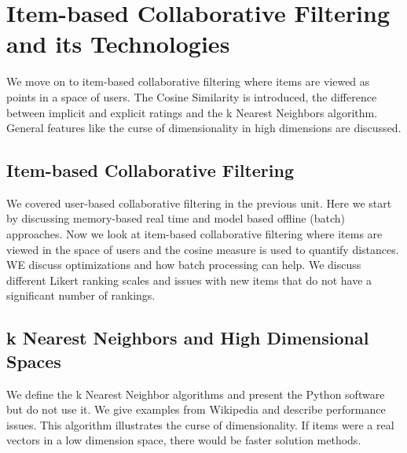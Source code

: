 \section{Item-based Collaborative Filtering and its
Technologies}\label{item-based-collaborative-filtering-and-its-technologies}

We move on to item-based collaborative filtering where items are viewed
as points in a space of users. The Cosine Similarity is introduced, the
difference between implicit and explicit ratings and the k Nearest
Neighbors algorithm. General features like the curse of dimensionality
in high dimensions are discussed.



\subsection{Item-based Collaborative
Filtering}\label{item-based-collaborative-filtering}

We covered user-based collaborative filtering in the previous unit. Here
we start by discussing memory-based real time and model based offline
(batch) approaches. Now we look at item-based collaborative filtering
where items are viewed in the space of users and the cosine measure is
used to quantify distances. WE discuss optimizations and how batch
processing can help. We discuss different Likert ranking scales and
issues with new items that do not have a significant number of rankings.




\subsection{k Nearest Neighbors and High Dimensional
Spaces}\label{k-nearest-neighbors-and-high-dimensional-spaces}

We define the k Nearest Neighbor algorithms and present the Python
software but do not use it. We give examples from Wikipedia and describe
performance issues. This algorithm illustrates the curse of
dimensionality. If items were a real vectors in a low dimension space,
there would be faster solution methods.


